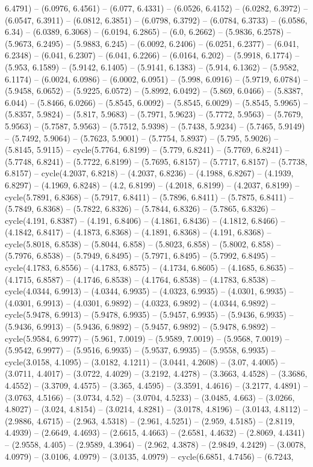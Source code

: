 6.4791) -- (6.0976, 6.4561) -- (6.077, 6.4331) -- (6.0526, 6.4152) -- (6.0282, 6.3972) -- (6.0547, 6.3911) -- (6.0812, 6.3851) -- (6.0798, 6.3792) -- (6.0784, 6.3733) -- (6.0586, 6.34) -- (6.0389, 6.3068) -- (6.0194, 6.2865) -- (6.0, 6.2662) -- (5.9836, 6.2578) -- (5.9673, 6.2495) -- (5.9883, 6.245) -- (6.0092, 6.2406) -- (6.0251, 6.2377) -- (6.041, 6.2348) -- (6.041, 6.2307) -- (6.041, 6.2266) -- (6.0164, 6.202) -- (5.9918, 6.1774) -- (5.953, 6.1589) -- (5.9142, 6.1405) -- (5.9141, 6.1383) -- (5.914, 6.1362) -- (5.9582, 6.1174) -- (6.0024, 6.0986) -- (6.0002, 6.0951) -- (5.998, 6.0916) -- (5.9719, 6.0784) -- (5.9458, 6.0652) -- (5.9225, 6.0572) -- (5.8992, 6.0492) -- (5.869, 6.0466) -- (5.8387, 6.044) -- (5.8466, 6.0266) -- (5.8545, 6.0092) -- (5.8545, 6.0029) -- (5.8545, 5.9965) -- (5.8357, 5.9824) -- (5.817, 5.9683) -- (5.7971, 5.9623) -- (5.7772, 5.9563) -- (5.7679, 5.9563) -- (5.7587, 5.9563) -- (5.7512, 5.9398) -- (5.7438, 5.9234) -- (5.7465, 5.9149) -- (5.7492, 5.9064) -- (5.7623, 5.9001) -- (5.7754, 5.8937) -- (5.795, 5.9026) -- (5.8145, 5.9115) -- cycle(5.7764, 6.8199) -- (5.779, 6.8241) -- (5.7769, 6.8241) -- (5.7748, 6.8241) -- (5.7722, 6.8199) -- (5.7695, 6.8157) -- (5.7717, 6.8157) -- (5.7738, 6.8157) -- cycle(4.2037, 6.8218) -- (4.2037, 6.8236) -- (4.1988, 6.8267) -- (4.1939, 6.8297) -- (4.1969, 6.8248) -- (4.2, 6.8199) -- (4.2018, 6.8199) -- (4.2037, 6.8199) -- cycle(5.7891, 6.8368) -- (5.7917, 6.8411) -- (5.7896, 6.8411) -- (5.7875, 6.8411) -- (5.7849, 6.8368) -- (5.7822, 6.8326) -- (5.7844, 6.8326) -- (5.7865, 6.8326) -- cycle(4.191, 6.8387) -- (4.191, 6.8406) -- (4.1861, 6.8436) -- (4.1812, 6.8466) -- (4.1842, 6.8417) -- (4.1873, 6.8368) -- (4.1891, 6.8368) -- (4.191, 6.8368) -- cycle(5.8018, 6.8538) -- (5.8044, 6.858) -- (5.8023, 6.858) -- (5.8002, 6.858) -- (5.7976, 6.8538) -- (5.7949, 6.8495) -- (5.7971, 6.8495) -- (5.7992, 6.8495) -- cycle(4.1783, 6.8556) -- (4.1783, 6.8575) -- (4.1734, 6.8605) -- (4.1685, 6.8635) -- (4.1715, 6.8587) -- (4.1746, 6.8538) -- (4.1764, 6.8538) -- (4.1783, 6.8538) -- cycle(4.0344, 6.9913) -- (4.0344, 6.9935) -- (4.0323, 6.9935) -- (4.0301, 6.9935) -- (4.0301, 6.9913) -- (4.0301, 6.9892) -- (4.0323, 6.9892) -- (4.0344, 6.9892) -- cycle(5.9478, 6.9913) -- (5.9478, 6.9935) -- (5.9457, 6.9935) -- (5.9436, 6.9935) -- (5.9436, 6.9913) -- (5.9436, 6.9892) -- (5.9457, 6.9892) -- (5.9478, 6.9892) -- cycle(5.9584, 6.9977) -- (5.961, 7.0019) -- (5.9589, 7.0019) -- (5.9568, 7.0019) -- (5.9542, 6.9977) -- (5.9516, 6.9935) -- (5.9537, 6.9935) -- (5.9558, 6.9935) -- cycle(3.0158, 4.1095) -- (3.0182, 4.1211) -- (3.0441, 4.2608) -- (3.07, 4.4005) -- (3.0711, 4.4017) -- (3.0722, 4.4029) -- (3.2192, 4.4278) -- (3.3663, 4.4528) -- (3.3686, 4.4552) -- (3.3709, 4.4575) -- (3.365, 4.4595) -- (3.3591, 4.4616) -- (3.2177, 4.4891) -- (3.0763, 4.5166) -- (3.0734, 4.52) -- (3.0704, 4.5233) -- (3.0485, 4.663) -- (3.0266, 4.8027) -- (3.024, 4.8154) -- (3.0214, 4.8281) -- (3.0178, 4.8196) -- (3.0143, 4.8112) -- (2.9886, 4.6715) -- (2.963, 4.5318) -- (2.961, 4.5251) -- (2.959, 4.5185) -- (2.8119, 4.4939) -- (2.6649, 4.4693) -- (2.6615, 4.4663) -- (2.6581, 4.4632) -- (2.8069, 4.4341) -- (2.9558, 4.405) -- (2.9589, 4.3964) -- (2.962, 4.3878) -- (2.9849, 4.2429) -- (3.0078, 4.0979) -- (3.0106, 4.0979) -- (3.0135, 4.0979) -- cycle(6.6851, 4.7456) -- (6.7243, 